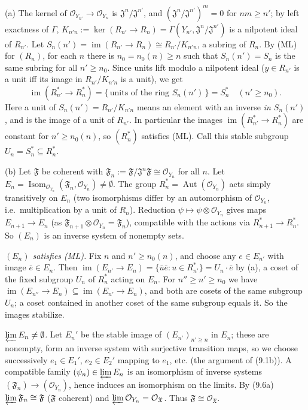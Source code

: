 \documentclass[11pt]{article}
\begin{document}
(a) The kernel of $\mathcal O_{Y_{n'}}\to\mathcal O_{Y_n}$ is $\mathfrak J^n/\mathfrak J^{n'}$, and $(\mathfrak J^n/\mathfrak J^{n'})^m=0$ for $nm\ge n'$; by left exactness of $\Gamma$, $K_{n'n}:=\ker(R_{n'}\to R_n)=\Gamma(Y_{n'},\mathfrak J^n/\mathfrak J^{n'})$ is a nilpotent ideal of $R_{n'}$. Let $S_n(n')=\operatorname{im}(R_{n'}\to R_n)\cong R_{n'}/K_{n'n}$, a subring of $R_n$. By (ML) for $(R_n)$, for each $n$ there is $n_0=n_0(n)\ge n$ such that $S_n(n')=S_n$ is the same subring for all $n'\ge n_0$. Since units lift modulo a nilpotent ideal ($y\in R_{n'}$ is a unit iff its image in $R_{n'}/K_{n'n}$ is a unit), we get
\[\operatorname{im}(R_{n'}^*\to R_n^*)=\{\,\text{units of the ring }S_n(n')\,\}=S_n^*\quad(n'\ge n_0).\]
Here a unit of $S_n(n')=R_{n'}/K_{n'n}$ means an element with an inverse \emph{in $S_n(n')$}, and is the image of a unit of $R_{n'}$. In particular the images $\operatorname{im}(R_{n'}^*\to R_n^*)$ are constant for $n'\ge n_0(n)$, so $(R_n^*)$ satisfies (ML). Call this stable subgroup $U_n=S_n^*\subseteq R_n^*$.

(b) Let $\mathfrak F$ be coherent with $\mathfrak F_n:=\mathfrak F/\mathfrak J^n\mathfrak F\cong\mathcal O_{Y_n}$ for all $n$. Let $E_n=\operatorname{Isom}_{\mathcal O_{Y_n}}(\mathfrak F_n,\mathcal O_{Y_n})\ne\emptyset$. The group $R_n^*=\operatorname{Aut}(\mathcal O_{Y_n})$ acts simply transitively on $E_n$ (two isomorphisms differ by an automorphism of $\mathcal O_{Y_n}$, i.e.\ multiplication by a unit of $R_n$). Reduction $\psi\mapsto\psi\otimes\mathcal O_{Y_n}$ gives maps $E_{n+1}\to E_n$ (as $\mathfrak F_{n+1}\otimes\mathcal O_{Y_n}=\mathfrak F_n$), compatible with the actions via $R^*_{n+1}\to R^*_n$. So $(E_n)$ is an inverse system of nonempty sets.

\emph{$(E_n)$ satisfies (ML).} Fix $n$ and $n'\ge n_0(n)$, and choose any $e\in E_{n'}$ with image $\bar e\in E_n$. Then $\operatorname{im}(E_{n'}\to E_n)=\{\bar u\bar e:u\in R_{n'}^*\}=U_n\cdot\bar e$ by (a), a coset of the fixed subgroup $U_n$ of $R_n^*$ acting on $E_n$. For $n''\ge n'\ge n_0$ we have $\operatorname{im}(E_{n''}\to E_n)\subseteq\operatorname{im}(E_{n'}\to E_n)$, and both are cosets of the same subgroup $U_n$; a coset contained in another coset of the same subgroup equals it. So the images stabilize.

\emph{$\varprojlim E_n\neq\emptyset$.} Let $E_n'$ be the stable image of $(E_{n'})_{n'\ge n}$ in $E_n$; these are nonempty, form an inverse system with surjective transition maps, so we choose successively $e_1\in E_1'$, $e_2\in E_2'$ mapping to $e_1$, etc. (the argument of (9.1b)). A compatible family $(\psi_n)\in\varprojlim E_n$ is an isomorphism of inverse systems $(\mathfrak F_n)\to(\mathcal O_{Y_n})$, hence induces an isomorphism on the limits. By (9.6a) $\varprojlim\mathfrak F_n\cong\mathfrak F$ ($\mathfrak F$ coherent) and $\varprojlim\mathcal O_{Y_n}=\mathcal O_{\mathfrak X}$. Thus $\mathfrak F\cong\mathcal O_{\mathfrak X}$.
\end{document}
